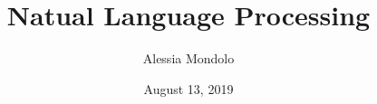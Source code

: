 \documentclass[10pt]{beamer}
\title[Intro to NLP]{Natual Language Processing}
\author{Alessia Mondolo}
\institute{Academy AI}
\date{August 13, 2019}
\begin{document}
\begin{frame}
  \titlepage
\end{frame}







\end{document}
